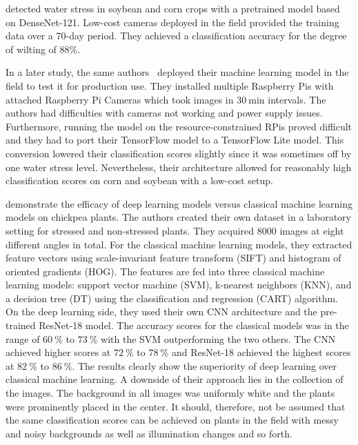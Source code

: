 \documentclass[draft,final]{vutinfth} %
\begin{document}
\textcite{ramos-giraldo2020} detected water stress in soybean and corn
crops with a pretrained model based on DenseNet-121. Low-cost cameras
deployed in the field provided the training data over a 70-day
period. They achieved a classification accuracy for the degree of
wilting of 88\%.

In a later study, the same authors~\cite{ramos-giraldo2020a} deployed
their machine learning model in the field to test it for production
use. They installed multiple Raspberry Pis with attached Raspberry Pi
Cameras which took images in $\qty{30}{\minute}$ intervals. The
authors had difficulties with cameras not working and power supply
issues. Furthermore, running the model on the resource-constrained
RPis proved difficult and they had to port their TensorFlow model to a
TensorFlow Lite model. This conversion lowered their classification
scores slightly since it was sometimes off by one water stress
level. Nevertheless, their architecture allowed for reasonably high
classification scores on corn and soybean with a low-cost setup.

\textcite{azimi2020} demonstrate the efficacy of deep learning models
versus classical machine learning models on chickpea plants. The
authors created their own dataset in a laboratory setting for stressed
and non-stressed plants. They acquired 8000 images at eight different
angles in total. For the classical machine learning models, they
extracted feature vectors using scale-invariant feature transform
(SIFT) and histogram of oriented gradients (HOG). The features are fed
into three classical machine learning models: support vector machine
(SVM), k-nearest neighbors (KNN), and a decision tree (DT) using the
classification and regression (CART) algorithm. On the deep learning
side, they used their own CNN architecture and the pre-trained
ResNet-18 model. The accuracy scores for the classical models was in
the range of $\qty{60}{\percent}$ to $\qty{73}{\percent}$ with the SVM
outperforming the two others. The CNN achieved higher scores at
$\qty{72}{\percent}$ to $\qty{78}{\percent}$ and ResNet-18 achieved
the highest scores at $\qty{82}{\percent}$ to
$\qty{86}{\percent}$. The results clearly show the superiority of deep
learning over classical machine learning. A downside of their approach
lies in the collection of the images. The background in all images was
uniformly white and the plants were prominently placed in the
center. It should, therefore, not be assumed that the same
classification scores can be achieved on plants in the field with
messy and noisy backgrounds as well as illumination changes and so
forth.
\end{document}
